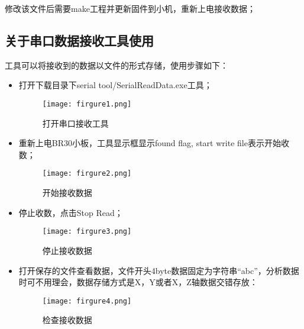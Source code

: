 修改该文件后需要make工程并更新固件到小机，重新上电接收数据；


\subsection{关于串口数据接收工具使用}
工具可以将接收到的数据以文件的形式存储，使用步骤如下：
\begin{itemize}
\item 打开下载目录下serial tool/SerialReadData.exe工具；
\begin{figure}[H]
\centering
\texttt{[image: firgure1.png]}
\caption{打开串口接收工具}
\end{figure}

\item 重新上电BR30小板，工具显示框显示found flag, start write file表示开始收数；
\begin{figure}[H]
\centering
\texttt{[image: firgure2.png]}
\caption{开始接收数据}
\end{figure}

\item 停止收数，点击Stop Read；
\begin{figure}[H]
\centering
\texttt{[image: firgure3.png]}
\caption{停止接收数据}
\end{figure}

\item 打开保存的文件查看数据，文件开头4byte数据固定为字符串“abc”，分析数据时可不用理会，数据存储方式是X，Y或者X，Z轴数据交错存放：
\begin{figure}[H]
\centering
\texttt{[image: firgure4.png]}
\caption{检查接收数据}
\end{figure}


\end{itemize}

